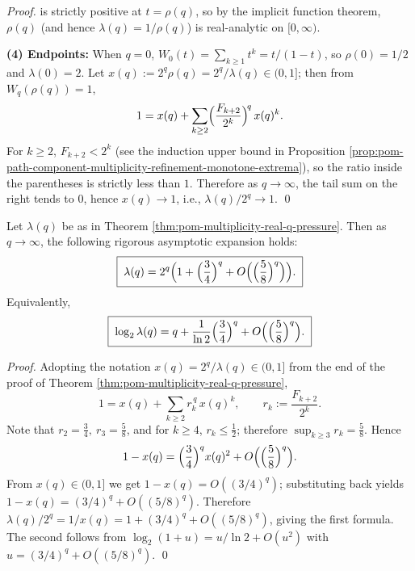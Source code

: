 \begin{proof}
\)
is strictly positive at \(t=\rho(q)\), so by the implicit function theorem, \(\rho(q)\) (and hence \(\lambda(q)=1/\rho(q)\)) is real-analytic on \([0,\infty)\).
\par
\textbf{(4) Endpoints:} When \(q=0\), \(W_0(t)=\sum_{k\ge 1}t^k=t/(1-t)\), so \(\rho(0)=1/2\) and \(\lambda(0)=2\).
Let \(x(q):=2^q\rho(q)=2^q/\lambda(q)\in(0,1]\); then from \(W_q(\rho(q))=1\),
\[
1=x(q)+\sum_{k\ge 2}\Bigl(\frac{F_{k+2}}{2^{k}}\Bigr)^{\!q}\,x(q)^k.
\]
For \(k\ge 2\), \(F_{k+2}<2^k\) (see the induction upper bound in Proposition \ref{prop:pom-path-component-multiplicity-refinement-monotone-extrema}), so the ratio inside the parentheses is strictly less than \(1\).
Therefore as \(q\to\infty\), the tail sum on the right tends to \(0\), hence \(x(q)\to 1\), i.e., \(\lambda(q)/2^q\to 1\). \qed
\end{proof}

\begin{proposition}\label{prop:pom-multiplicity-lambdaq-large-q-asymptotic}
Let \(\lambda(q)\) be as in Theorem \ref{thm:pom-multiplicity-real-q-pressure}.
Then as \(q\to\infty\), the following rigorous asymptotic expansion holds:
\[
\boxed{\;
\lambda(q)=2^{q}\Bigl(1+\Bigl(\frac34\Bigr)^{q}+O\Bigl(\Bigl(\frac58\Bigr)^{q}\Bigr)\Bigr).\;}
\]
Equivalently,
\[
\boxed{\;
\log_2\lambda(q)=q+\frac{1}{\ln 2}\Bigl(\frac34\Bigr)^{q}+O\Bigl(\Bigl(\frac58\Bigr)^{q}\Bigr).\;}
\]
\end{proposition}
\begin{proof}
Adopting the notation \(x(q)=2^q/\lambda(q)\in(0,1]\) from the end of the proof of Theorem \ref{thm:pom-multiplicity-real-q-pressure},
\[
1=x(q)+\sum_{k\ge 2}r_k^{\,q}\,x(q)^k,\qquad
r_k:=\frac{F_{k+2}}{2^k}.
\]
Note that
\(
r_2=\frac34,\ r_3=\frac58
\), and for \(k\ge 4\), \(r_k\le \frac12\); therefore \(\sup_{k\ge 3}r_k=\frac58\).
Hence
\[
1-x(q)=\Bigl(\frac34\Bigr)^{q}x(q)^2+O\Bigl(\Bigl(\frac58\Bigr)^{q}\Bigr).
\]
From \(x(q)\in(0,1]\) we get \(1-x(q)=O((3/4)^q)\); substituting back yields
\(
1-x(q)=(3/4)^q+O((5/8)^q)
\).
Therefore
\(
\lambda(q)/2^q=1/x(q)=1+(3/4)^q+O((5/8)^q)
\), giving the first formula.
The second follows from \(\log_2(1+u)=u/\ln 2+O(u^2)\) with \(u=(3/4)^q+O((5/8)^q)\). \qed
\end{proof}

